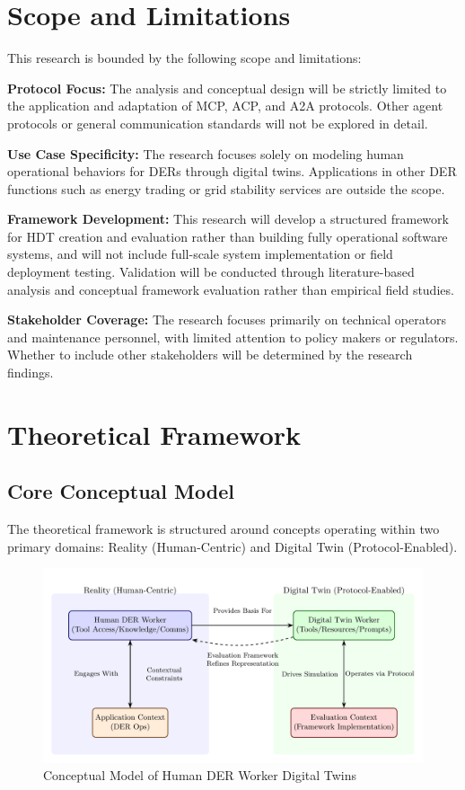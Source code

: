 \documentclass[12pt,a4paper]{article}
\begin{document}
\section{Scope and Limitations}
\label{sec:scope}

This research is bounded by the following scope and limitations:

\textbf{Protocol Focus:} The analysis and conceptual design will be strictly limited to the application and adaptation of MCP, ACP, and A2A protocols. Other agent protocols or general communication standards will not be explored in detail.

\textbf{Use Case Specificity:} The research focuses solely on modeling human operational behaviors for DERs through digital twins. Applications in other DER functions such as energy trading or grid stability services are outside the scope.

\textbf{Framework Development:} This research will develop a structured framework for HDT creation and evaluation rather than building fully operational software systems, and will not include full-scale system implementation or field deployment testing. Validation will be conducted through literature-based analysis and conceptual framework evaluation rather than empirical field studies.

\textbf{Stakeholder Coverage:} The research focuses primarily on technical operators and maintenance personnel, with limited attention to policy makers or regulators. Whether to include other stakeholders will be determined by the research findings.

\section{Theoretical Framework}
\label{sec:framework}

\subsection{Core Conceptual Model}

The theoretical framework is structured around concepts operating within two primary domains: Reality (Human-Centric) and Digital Twin (Protocol-Enabled).

\begin{figure}[h!]
    \centering
    \includegraphics[width=.8\linewidth]{conceptual-model-diagram-1.png}
    \caption{Conceptual Model of Human DER Worker Digital Twins}
    \label{fig:conceptual-model}
\end{figure}
\end{document}
